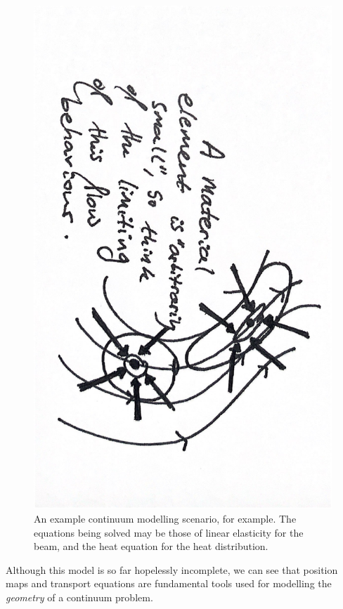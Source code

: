 \begin{figure}[H]
\centerline{\includegraphics[angle=90,page=9,width=0.5\linewidth]{figures/2.pdf}}
\caption{\small An example continuum modelling scenario, for example. The equations being solved
may be those of linear elasticity for the beam, and the heat equation for the heat distribution.}
\label{sketch_beam_heat}
\end{figure}
Although this model is so far hopelessly incomplete, we can see that position maps and transport equations are fundamental tools
used for modelling the \textit{geometry} of a continuum problem.


% 
% 
